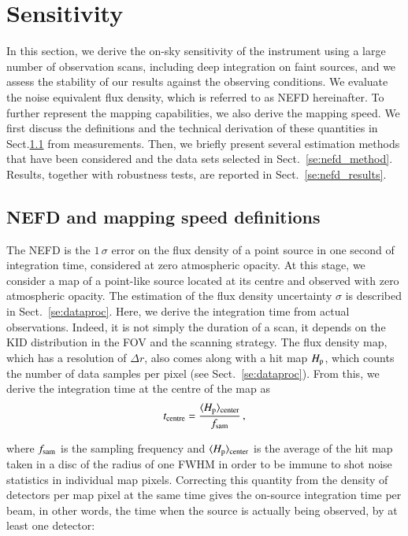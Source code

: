 \documentclass[traditionalabstract]{aa}
\begin{document}
{\section{Sensitivity}
\label{se:sensitivity}
%

In this section, we derive the on-sky sensitivity of the instrument using a
large number of observation scans, including deep integration on faint sources,
and we assess the stability of our results against the observing
conditions.
We evaluate the noise equivalent flux density, which is referred to as
NEFD hereinafter. To further represent the mapping capabilities, we also
derive the mapping speed.
We first discuss the definitions and the technical derivation of these quantities in
Sect.\ref{se:integration_time} from measurements. Then, we briefly present
several estimation methods that have been considered and the data sets  selected in Sect.~\ref{se:nefd_method}. Results, together with robustness
tests, are reported in Sect.~\ref{se:nefd_results}.


\subsection{NEFD and mapping speed definitions}
\label{se:integration_time}

The NEFD is the $1\,\sigma$ error on the flux
density of a point source in one second of integration time,
considered at zero atmospheric opacity.
At this stage, we consider a map of a point-like source located at its
centre and observed with zero atmospheric opacity. The estimation of
the flux density uncertainty $\sigma$ is described in Sect.~\ref{se:dataproc}.
Here, we derive the integration time from actual observations. Indeed,
it is not simply the duration of a scan, it depends on the KID
distribution in the FOV and the scanning strategy.
The flux density map, which has a resolution of $\Delta r$, also comes
along with a hit map $H_{\rm{p}}$, which counts the number of
data samples per pixel (see Sect.~\ref{se:dataproc}).
From this, we derive the integration time at the centre
of the map as
\begin{equation}
t_{\rm{centre}} = \frac{\langle H_{\rm{p}}\rangle_{\rm{center}}}{f_{\rm{sam}}}\,,
\end{equation}

where $f_{\rm{sam}}$ is the sampling frequency and $\langle
H_{\rm{p}}\rangle_{\rm{center}}$ is the average of the hit map taken in a disc
of the radius of one FWHM in order to be immune to shot noise statistics in individual map
pixels. Correcting this quantity from the density of detectors per map pixel at
the same time gives the on-source integration time per beam, in other
words, the time when the source is actually being observed, by at least one
detector:

}
\end{document}

